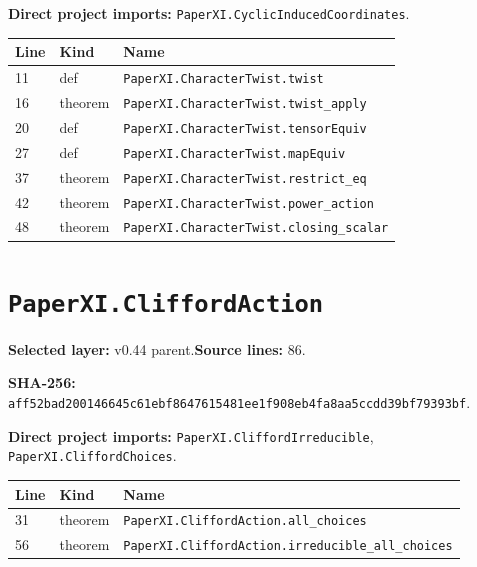 \documentclass[10pt,oneside]{book}
\begin{document}

\textbf{Direct project imports:} \nolinkurl{PaperXI.CyclicInducedCoordinates}.

\begin{longtable}{@{}p{}p{}p{}@{}}\toprule Line&Kind&Name\\\midrule\endhead

11&def&\nolinkurl{PaperXI.CharacterTwist.twist}\\

16&theorem&\nolinkurl{PaperXI.CharacterTwist.twist_apply}\\

20&def&\nolinkurl{PaperXI.CharacterTwist.tensorEquiv}\\

27&def&\nolinkurl{PaperXI.CharacterTwist.mapEquiv}\\

37&theorem&\nolinkurl{PaperXI.CharacterTwist.restrict_eq}\\

42&theorem&\nolinkurl{PaperXI.CharacterTwist.power_action}\\

48&theorem&\nolinkurl{PaperXI.CharacterTwist.closing_scalar}\\

\bottomrule\end{longtable}

\section{\texorpdfstring{\nolinkurl{PaperXI.CliffordAction}}{PaperXI.CliffordAction}}\label{module:PaperXI.CliffordAction}

\textbf{Selected layer:} v0.44 parent.\quad\textbf{Source lines:} 86.\par\textbf{SHA-256:} {\scriptsize\nolinkurl{aff52bad200146645c61ebf8647615481ee1f908eb4fa8aa5ccdd39bf79393bf}}.


\textbf{Direct project imports:} \nolinkurl{PaperXI.CliffordIrreducible}, \nolinkurl{PaperXI.CliffordChoices}.

\begin{longtable}{@{}p{}p{}p{}@{}}\toprule Line&Kind&Name\\\midrule\endhead

31&theorem&\nolinkurl{PaperXI.CliffordAction.all_choices}\\

56&theorem&\nolinkurl{PaperXI.CliffordAction.irreducible_all_choices}\\

\bottomrule\end{longtable}
\end{document}
